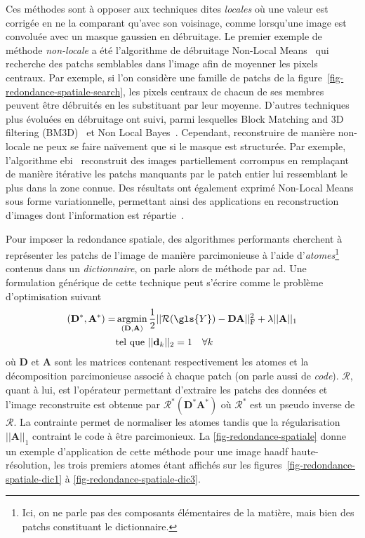 Ces méthodes sont à opposer aux techniques dites \emph{locales} où une valeur est corrigée en ne la comparant qu'avec son voisinage, comme lorsqu'une image est convoluée avec un masque gaussien en débruitage. Le premier exemple de méthode \emph{non-locale} a été l'algorithme de débruitage Non-Local Means~\cite{buades2005non} qui recherche des patchs semblables dans l'image afin de moyenner les pixels centraux. Par exemple, si l'on considère une famille de patchs de la figure~\ref{fig-redondance-spatiale-search}, les pixels centraux de chacun de ses membres peuvent être débruités en les substituant par leur moyenne. D'autres techniques plus évoluées en débruitage ont suivi, parmi lesquelles Block Matching and 3D filtering (BM3D)~\cite{dabov2007image} et Non Local Bayes~\cite{lebrun2013nonlocal}. Cependant, reconstruire de manière non-locale ne peux se faire naïvement que si le masque est structurée. Par exemple, l'algorithme \gls{ebi}~\cite{criminisi2004region} reconstruit des images partiellement corrompus en remplaçant de manière itérative les patchs manquants par le patch entier lui ressemblant le plus dans la zone connue. Des résultats ont également exprimé Non-Local Means sous forme variationnelle, permettant ainsi des applications en reconstruction d'images dont l'information est répartie~\cite{peyre2008non, unni2018non, arias2009variational, yang2012nonlocal}.

Pour imposer la redondance spatiale, des algorithmes performants cherchent à représenter les patchs de l'image de manière parcimonieuse à l'aide d'\emph{atomes}\footnote{Ici, on ne parle pas des composants élémentaires de la matière, mais bien des patchs constituant le dictionnaire.} contenus dans un \emph{dictionnaire}, on parle alors de méthode par \gls{ad}. Une formulation générique de cette technique peut s'écrire comme le problème d'optimisation suivant~\cite{mairal2009online}
\begin{equation}
    \begin{aligned}
    (\mathbf{D}^*,\mathbf{A}^*) = &\argmin_{(\mathbf{D}, \mathbf{A})}
    \frac{1}{2} \frobnorm{ \mathcal{R}(\gls{Y}) - \mathbf{D A}} + \lambda  || \mathbf{A} ||_1\\
    &\text{tel que } || \mathbf{d}_k ||_2 = 1 \quad \forall k\\
    \end{aligned}
\end{equation}
où $\mathbf{D}$ et $\mathbf{A}$ sont les matrices contenant respectivement les atomes et la décomposition parcimonieuse associé à chaque patch (on parle aussi de \emph{code}). $\mathcal{R}$, quant à lui, est l'opérateur permettant d'extraire les patchs des données et l'image reconstruite est obtenue par $\mathcal{R}^*(\mathbf{D}^*\mathbf{A}^*)$ où $\mathcal{R}^*$ est un pseudo inverse de $\mathcal{R}$. La contrainte permet de normaliser les atomes tandis que la régularisation $|| \mathbf{A} ||_1$ contraint le code à être parcimonieux. 
%
La \cref{fig-redondance-spatiale} donne un exemple d'application de cette méthode pour une image \gls{haadf} haute-résolution, les trois premiers atomes étant affichés sur les figures~\ref{fig-redondance-spatiale-dic1} à \ref{fig-redondance-spatiale-dic3}.
%

